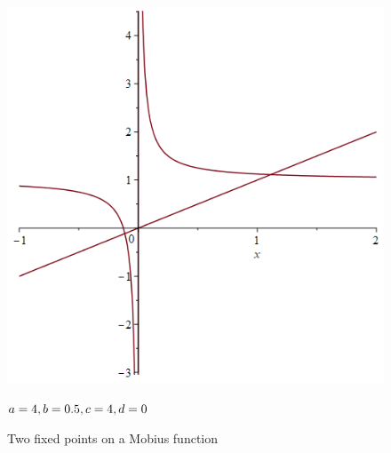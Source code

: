 \documentclass[12pt]{article}
\begin{document}
	\begin{figure}[H]
		\begin{minipage}{0.725\textwidth}
			\hfill
			\includegraphics[scale=0.4]{1_2_fixedPoints.png}
		\end{minipage}
	\hfill
		\begin{minipage}{0.2\textwidth}
			$a=4,\\b=0.5,\\ c=4,\\ d=0\\$
		\end{minipage}
	\caption{Two fixed points on a Mobius function}
	\label{fig:mobFix}
	\end{figure}
\newpage
\end{document}
